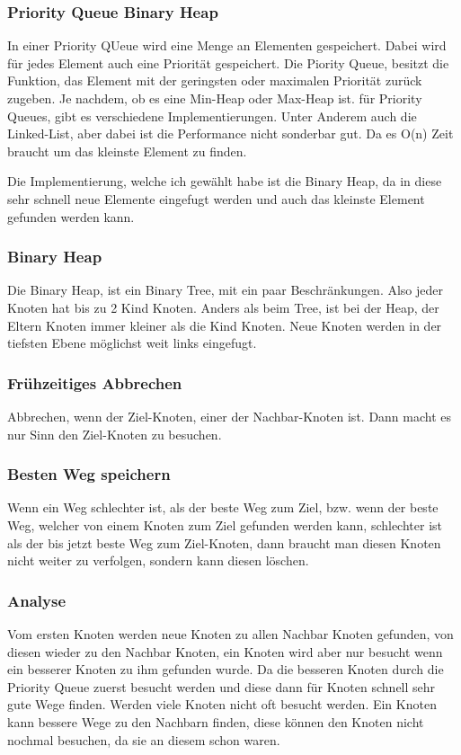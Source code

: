 \documentclass[a4paper,12pt,arial]{scrartcl}
\begin{document}
\subsubsection{Priority Queue Binary Heap}
In einer Priority QUeue wird eine Menge an Elementen gespeichert. Dabei wird für jedes Element auch eine Priorität gespeichert.
Die Piority Queue, besitzt die Funktion, das Element mit der geringsten oder maximalen Priorität zurück zugeben. Je nachdem, ob es eine Min-Heap oder Max-Heap ist.
für Priority Queues, gibt es verschiedene Implementierungen. Unter Anderem auch die Linked-List, aber dabei ist die Performance nicht sonderbar gut. Da es O(n) Zeit braucht um das kleinste Element zu finden.
\textcite{skienaPriorityQueue}

Die Implementierung, welche ich gewählt habe ist die Binary Heap, da in diese sehr schnell neue Elemente eingefugt werden und auch das kleinste Element gefunden werden kann.

\subsubsection{Binary Heap}
Die Binary Heap, ist ein Binary Tree, mit ein paar Beschränkungen.
Also jeder Knoten hat bis zu 2 Kind Knoten.
Anders als beim Tree, ist bei der Heap, der Eltern Knoten immer kleiner als die Kind Knoten.
Neue Knoten werden in der tiefsten Ebene möglichst weit links eingefugt.


\subsubsection{Frühzeitiges Abbrechen}
Abbrechen, wenn der Ziel-Knoten, einer der Nachbar-Knoten ist. Dann macht es nur Sinn den Ziel-Knoten zu besuchen.

\subsubsection{Besten Weg speichern}
Wenn ein Weg schlechter ist, als der beste Weg zum Ziel, bzw. wenn der beste Weg, welcher von einem Knoten zum Ziel gefunden werden kann, schlechter ist als der bis jetzt beste Weg zum Ziel-Knoten, dann braucht man diesen Knoten nicht weiter zu verfolgen, sondern kann diesen löschen.

 
\subsubsection{Analyse}
Vom ersten Knoten werden neue Knoten zu allen Nachbar Knoten gefunden, von diesen wieder zu den Nachbar Knoten, ein Knoten wird aber nur besucht wenn ein besserer Knoten zu ihm gefunden wurde. Da die besseren Knoten durch die Priority Queue zuerst besucht werden und diese dann für Knoten schnell sehr gute Wege finden. Werden viele Knoten nicht oft besucht werden. Ein Knoten kann bessere Wege zu den Nachbarn finden, diese können den Knoten nicht nochmal besuchen, da sie an diesem schon waren.
\end{document}
